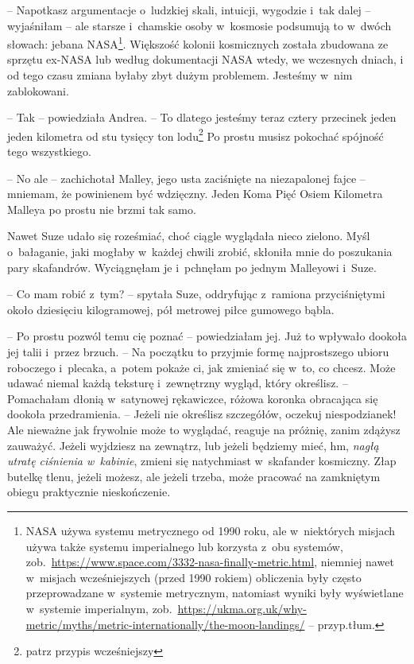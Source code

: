\documentclass[oneside,polish,11pt,sfheadings]{mwbk}
\begin{document}
-- Napotkasz argumentacje o~ludzkiej skali, intuicji, wygodzie i~tak
dalej -- wyjaśniłam -- ale starsze i~chamskie osoby w~kosmosie podsumują
to w~dwóch słowach: jebana NASA\footnote{ NASA używa systemu metrycznego od
1990 roku, ale w~niektórych misjach używa także systemu imperialnego lub
korzysta z~obu systemów,
zob.~\url{https://www.space.com/3332-nasa-finally-metric.html},
niemniej nawet w~misjach wcześniejszych (przed 1990 rokiem) obliczenia
były często przeprowadzane w~systemie metrycznym, natomiast wyniki były
wyświetlane w~systemie imperialnym,
zob.~\url{https://ukma.org.uk/why-metric/myths/metric-internationally/the-moon-landings/}
-- przyp.tłum.}. Większość kolonii kosmicznych została zbudowana ze
sprzętu ex-NASA lub według dokumentacji NASA wtedy, we wczesnych dniach,
i od tego czasu zmiana byłaby zbyt dużym problemem. Jesteśmy w~nim
zablokowani.

-- Tak -- powiedziała Andrea. -- To dlatego jesteśmy teraz cztery przecinek
jeden jeden kilometra od stu tysięcy ton lodu\footnote{ patrz przypis
wcześniejszy} Po prostu musisz pokochać spójność tego wszystkiego.

-- No ale -- zachichotał Malley, jego usta zaciśnięte na niezapalonej
fajce -- mniemam, że powinienem być wdzięczny. Jeden Koma Pięć Osiem
Kilometra Malleya po prostu nie brzmi tak samo.

Nawet Suze udało się roześmiać, choć ciągle wyglądała nieco zielono.
Myśl o~bałaganie, jaki mogłaby w~każdej chwili zrobić, skłoniła mnie do
poszukania pary skafandrów. Wyciągnęłam je i~pchnęłam po jednym
Malleyowi i~Suze.

-- Co mam robić z~tym? -- spytała Suze, oddryfując z~ramiona
przyciśniętymi około dziesięciu kilogramowej, pół metrowej piłce
gumowego bąbla.

-- Po prostu pozwól temu cię poznać -- powiedziałam jej. Już to wpływało
dookoła jej talii i~przez brzuch. -- Na początku to przyjmie formę
najprostszego ubioru roboczego i~plecaka, a~potem pokaże ci, jak
zmieniać się w~to, co chcesz. Może udawać niemal każdą teksturę i~zewnętrzny wygląd, który określisz. -- Pomachałam dłonią w~satynowej
rękawiczce, różowa koronka obracająca się dookoła przedramienia. -- Jeżeli nie określisz szczegółów, oczekuj niespodzianek! Ale nieważne jak
frywolnie może to wyglądać, reaguje na próżnię, zanim zdążysz zauważyć.
Jeżeli wyjdziesz na zewnątrz, lub jeżeli będziemy mieć, hm, \textit{nagłą
utratę ciśnienia w~kabinie}, zmieni się natychmiast w~skafander
kosmiczny. Złap butelkę tlenu, jeżeli możesz, ale jeżeli trzeba, może
pracować na zamkniętym obiegu praktycznie nieskończenie.
\end{document}
